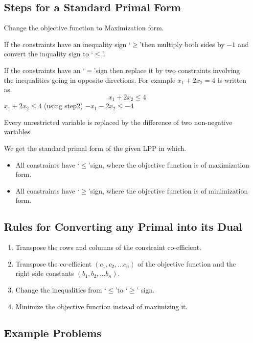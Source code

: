 \subsection{Steps for a Standard Primal Form}
\begin{steps}
\item Change the objective function to Maximization form.
\item If the constraints have an inequality sign \lq$ \geq $\rq then
    multiply both sides by $ -1 $ and convert the inquality sign to
    \lq$ \leq $\rq.
\item If the constraints have an \lq$ = $\rq sign then replace it by two
    constraints involving the inequalities going in opposite directions.
    For example $ x_{1} + 2x_{2} = 4 $ is written as
    $$ x_{1} + 2x_{2} \leq 4 $$
    $ x_{1} + 2x_{2} \leq 4 $ (using step2) $ - x_{1} - 2x_{2} \leq -4 $
\item Every unrestricted variable is replaced by the difference of two
    non-negative variables.
\item We get the standard primal form of the given LPP in which.
    \begin{itemize}
        \item All constraints have \lq$ \leq $\rq sign, where the
            objective function is of maximization form.
        \item All constraints have \lq$ \geq $\rq sign, where the
            objective function is of minimization form.
    \end{itemize}
\end{steps}

\subsection{Rules for Converting any Primal into its Dual}
\begin{enumerate}
    \item Transpose the rows and columns of the constraint co-efficient.
    \item Transpose the co-efficient $ (c_{1}, c_{2}, \ldots c_{n}) $ of
        the objective function and the right side constants $ (b_{1},
        b_{2}, \ldots b_{n}) $.
    \item Change the inequalities from \lq$ \leq $\rq to \lq$ \geq $\rq 
        sign.
    \item Minimize the objective function instead of maximizing it.
\end{enumerate}

\subsection{Example Problems}
